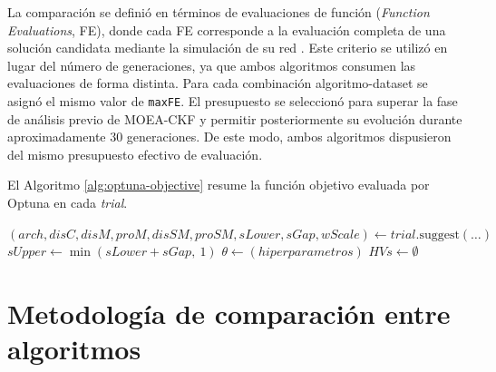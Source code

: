 La comparación se definió en términos de evaluaciones de función (\textit{Function Evaluations}, FE), donde cada FE corresponde a la evaluación completa de una solución candidata mediante la simulación de su red \cite{MOEA/CKF, 10066873_S-NSGA-II}. Este criterio se utilizó en lugar del número de generaciones, ya que ambos algoritmos consumen las evaluaciones de forma distinta. Para cada combinación algoritmo-dataset se asignó el mismo valor de \texttt{maxFE}. El presupuesto se seleccionó para superar la fase de análisis previo de MOEA-CKF y permitir posteriormente su evolución durante aproximadamente 30 generaciones. De este modo, ambos algoritmos dispusieron del mismo presupuesto efectivo de evaluación.

El Algoritmo \ref{alg:optuna-objective} resume la función objetivo evaluada por Optuna en cada \textit{trial}. \\

\begin{algorithm}[H]
\small
\caption{FunciónObjetivo$(trial)$}
\label{alg:optuna-objective}
$(arch, disC, disM, proM, disSM, proSM, sLower, sGap, wScale) \leftarrow trial.\text{suggest}(\ldots)$ 
$sUpper \leftarrow \min(sLower + sGap,\ 1)$\;
$\theta \leftarrow (hiperparametros)$ 
$HVs \leftarrow \emptyset$\;
\end{algorithm}


\section{Metodología de comparación entre algoritmos}\label{sec:metodologia-comparacion}

